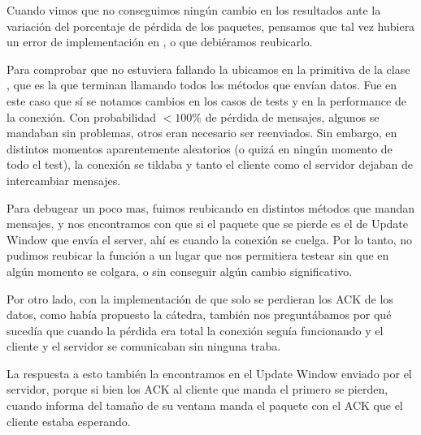   Cuando vimos que no conseguimos ning\'un cambio en los resultados ante la variaci\'on del porcentaje de p\'erdida de los paquetes, pensamos que tal vez hubiera un error de implementaci\'on en , o que debi\'eramos reubicarlo. 
  
  Para comprobar que no estuviera fallando la ubicamos en la primitiva  de la clase , que es la que terminan llamando todos los m\'etodos que env\'ian datos. Fue en este caso que s\'i se notamos cambios en los casos de tests y en la performance de la conexi\'on. Con probabilidad $<100\%$ de p\'erdida de mensajes, algunos se mandaban sin problemas, otros eran necesario ser reenviados. Sin embargo, en distintos momentos aparentemente aleatorios (o quiz\'a en ning\'un momento de todo el test), la conexi\'on se tildaba y tanto el cliente como el servidor dejaban de intercambiar mensajes. 
  
  Para debugear un poco mas, fuimos reubicando  en distintos m\'etodos que mandan mensajes, y nos encontramos con que si el paquete que se pierde es el de Update Window que env\'ia el server, ah\'i es cuando la conexi\'on se cuelga. Por lo tanto, no pudimos reubicar la funci\'on  a un lugar que nos permitiera testear sin que en alg\'un momento se colgara, o sin conseguir alg\'un cambio significativo. 
  
  Por otro lado, con la implementaci\'on de que solo se perdieran los ACK de los datos, como hab\'ia propuesto la c\'atedra, tambi\'en nos pregunt\'abamos por qu\'e suced\'ia que cuando la p\'erdida era total la conexi\'on segu\'ia funcionando y el cliente y el servidor se comunicaban sin ninguna traba. 
  
  La respuesta a esto tambi\'en la encontramos en el Update Window enviado por el servidor, porque si bien los ACK al cliente que manda el primero se pierden, cuando informa del tama\~no de su ventana manda el paquete con el ACK que el cliente estaba esperando. 